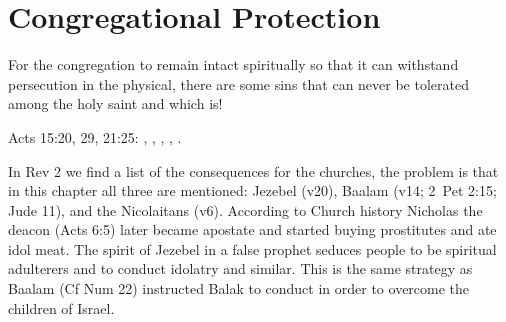 \section{Congregational Protection}

For the congregation to remain intact spiritually so that it can withstand persecution in the physical, there are some sins that can never be tolerated among the holy saint and which is!

Acts 15:20, 29, 21:25: , , , , .

In Rev 2 we find a list of the consequences for the churches, the problem is that in this chapter all three are mentioned: Jezebel (v20), Baalam (v14; 2~Pet 2:15; Jude 11), and the Nicolaitans (v6). According to Church history Nicholas the deacon (Acts 6:5) later became apostate and started buying prostitutes and ate idol meat. The spirit of Jezebel in a false prophet seduces people to be spiritual adulterers and to conduct idolatry and similar. This is the same strategy as Baalam (Cf Num 22) instructed Balak to conduct in order to overcome the children of Israel.
